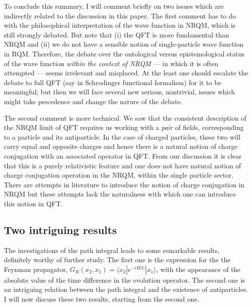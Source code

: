 \documentclass[12pt]{article}
\def\bk#1#2#3{{\langle #1|#2|#3\rangle}}  %
\begin{document}
To conclude this summary, I will comment briefly on two issues which are indirectly related to the discussion in this paper. The first comment  has to do with the  philosophical interpretation of  the  wave function in NRQM, which is still strongly debated. But note that (i)
 the QFT is more fundamental than NRQM and (ii) we do not have a sensible notion of single-particle wave function in RQM. Therefore, the debate over the ontological versus epistemological
status of the wave function \textit{within the context of NRQM} --- in which it is often attempted ---
seems irrelevant and misplaced. At the least one should escalate the debate to full QFT (say in Schrodinger functional formalism) for it to be meaningful; but then we will face several new serious, nontrivial, issues which might take precedence and change the nature of the debate.

The second comment is more technical. We saw that the consistent description of the NRQM limit of QFT requires us working with a \textit{pair} of fields, corresponding to a particle and its antiparticle.  
In the case of charged particles, these two will carry equal and opposite charges and hence there is a natural notion of charge conjugation with an associated operator in QFT. From our discussion it is clear that this is a purely relativistic feature and one does not have natural notion of charge conjugation operation in the NRQM, within the single particle sector. There are attempts in literature to introduce the notion of charge conjugation in NRQM but these attempts lack the naturalness with which one can introduce this notion in QFT. 






\subsection{Two intriguing results}

The investigations of the path integral leads to some remarkable results, definitely worthy of further study. The first one is the expression for the 
the Feynman propagator, $G_R(x_2 , x_1 )=\bk{x_2}{e^{-iH|t|}}{x_1}$,  with the appearance of the absolute value of the time difference in the evolution operator. The second one is an intriguing relation between the path integral and the existence of antiparticles. I will now discuss these two results, starting from the second one.
\end{document}
